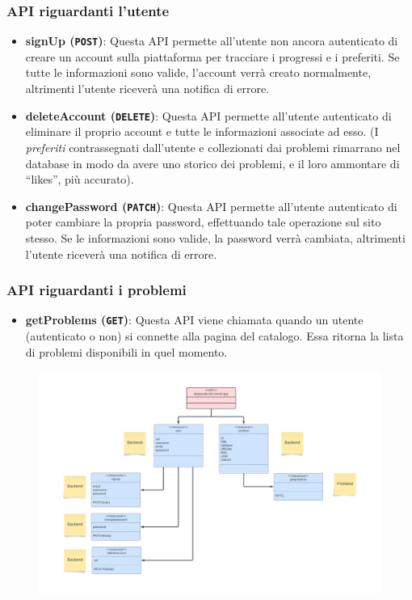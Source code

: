 \documentclass[11pt, a4paper]{article}
\theoremstyle{definition}
\begin{document}
\subsubsection{API riguardanti l'utente}
\begin{itemize}
  \item \textbf{signUp (\texttt{POST})}: Questa API permette all'utente non ancora autenticato di creare un account sulla piattaforma per tracciare i progressi e i preferiti. Se tutte le informazioni sono valide, l'account verrà creato normalmente, altrimenti l'utente riceverà una notifica di errore.
  \item \textbf{deleteAccount (\texttt{DELETE})}: Questa API permette all'utente autenticato di eliminare il proprio account e tutte le informazioni associate ad esso. (I \textit{preferiti} contrassegnati dall'utente e collezionati dai problemi rimarrano nel database in modo da avere uno storico dei problemi, e il loro ammontare di ``likes'', più accurato).
  \item \textbf{changePassword (\texttt{PATCH})}: Questa API permette all'utente autenticato di poter cambiare la propria password, effettuando tale operazione sul sito stesso. Se le informazioni sono valide, la password verrà cambiata, altrimenti l'utente riceverà una notifica di errore.
\end{itemize}

\subsubsection{API riguardanti i problemi}
\begin{itemize}
  \item \textbf{getProblems (\texttt{GET})}: Questa API viene chiamata quando un utente (autenticato o non) si connette alla pagina del catalogo. Essa ritorna la lista di problemi disponibili in quel momento.
\end{itemize}

\begin{figure}[H]
  \centering
  \includegraphics[width=\textwidth]{materiale/Resource diagram.png}
\end{figure}
\end{document}
